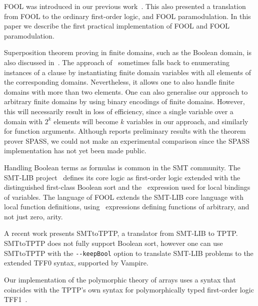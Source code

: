 FOOL was introduced in our previous work~\cite{FOOL}. This also presented a translation from FOOL to the ordinary first-order logic, and FOOL paramodulation. In this paper we describe the first practical implementation of FOOL and FOOL paramodulation.

Superposition theorem proving in finite domains, such as the Boolean domain, is also discussed in~\cite{HillenbrandWeidenbach13}. The approach of~\cite{HillenbrandWeidenbach13} sometimes falls back to enumerating instances of a clause by instantiating finite domain variables with all elements of the corresponding domains. Nevertheless, it allows one to also handle finite domains with more than two elements. One can also generalise our approach to arbitrary finite domains by using binary encodings of finite domains. However, this will necessarily result in loss of efficiency, since a single variable over a domain with $2^k$ elements will become $k$ variables in our approach, and similarly for function arguments.
Although \cite{HillenbrandWeidenbach13} reports preliminary results with the theorem prover SPASS, we could not make an experimental comparison since the SPASS implementation has not yet been made public.

Handling Boolean terms as formulas is common in the SMT community. The SMT-LIB project~\cite{SMT-LIB} defines its core logic as first-order logic extended with the distinguished first-class Boolean sort and the \LETIN\ expression used for local bindings of variables. The language of FOOL extends the SMT-LIB core language with local function definitions, using \LETIN\ expressions defining functions of arbitrary, and not just zero, arity.

A recent work \cite{SMTLIB2TPTP} presents SMTtoTPTP, a translator from SMT-LIB to TPTP. SMTtoTPTP does not fully support Boolean sort, however one can use SMTtoTPTP with the \verb'--keepBool' option to translate SMT-LIB problems to the extended TFF0 syntax, supported by Vampire.

Our implementation of the polymorphic theory of arrays uses a syntax that coincides with the TPTP's own syntax for polymorphically typed first-order logic TFF1~\cite{tff1}.
